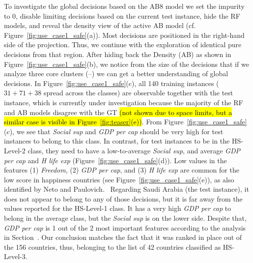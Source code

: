 To investigate the global decisions based on the AB8 model we set the impurity to 0, disable limiting decisions based on the current test instance, hide the RF models, and reveal the density view of the active AB model (cf. Figure~\ref{fig:use_case1_safe}(a)). Most decisions are positioned in the right-hand side of the projection. Thus, we continue with the exploration of identical pure decisions from that region. After hiding back the Density (AB) as shown in Figure~\ref{fig:use_case1_safe}(b), we notice from the size of the decisions that if we analyze three core clusters (--) we can get a better understanding of global decisions. In Figure~\ref{fig:use_case1_safe}(c), all 140 training instances ($31+71+38$ spread across the classes) are observable together with the  test instance, which is currently under investigation because the majority of the RF and AB models disagree with the GT \hl{(not shown due to space limits, but a similar case is visible in Figure~\ref{fig:teaser}(e))}. From Figure~\ref{fig:use_case1_safe}(c), we see that \emph{Social sup} and \emph{GDP per cap} should be very high for test instances to belong to this class. In contrast, for test instances to be in the HS-Level-2 class, they need to have a low-to-average \emph{Social sup}, and average \emph{GDP per cap} and \emph{H life exp} (Figure~\ref{fig:use_case1_safe}(d)). Low values in the features (1) \emph{Freedom}, (2) \emph{GDP per cap}, and (3) \emph{H life exp} are common for the low score in happiness countries (see Figure~\ref{fig:use_case1_safe}(e)), as also identified by Neto and Paulovich.~\cite{Neto2021Multivariate} Regarding Saudi Arabia (the  test instance), it does not appear to belong to any of those decisions, but it is far away from the values reported for the HS-Level-1 class. It has a very high \emph{GDP per cap} to belong in the average class, but the \emph{Social sup} is on the lower side. Despite that, \emph{GDP per cap} is 1 out of the 2 most important features according to the analysis in Section~. Our conclusion matches the fact that it was ranked in  place out of the 156 countries, thus, belonging to the list of 42 countries classified as HS-Level-3.

